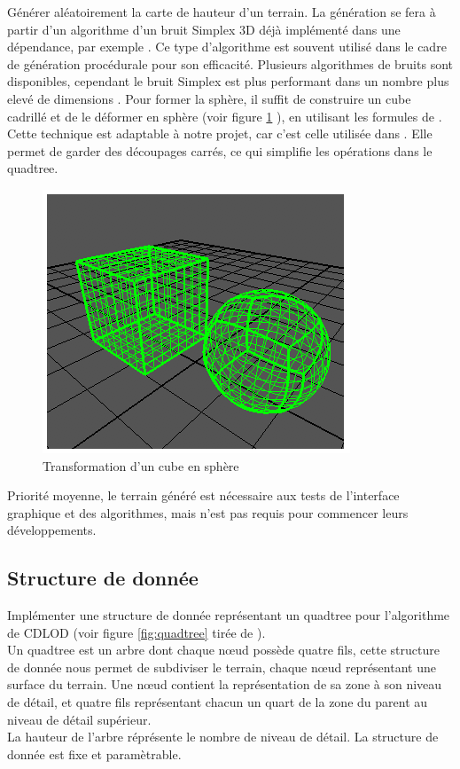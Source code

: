\documentclass[12pt]{report}
\begin{document}
Générer aléatoirement la carte de hauteur d'un terrain.  La génération
se fera à partir d'un algorithme d'un bruit Simplex 3D déjà implémenté
dans une dépendance, par exemple \cite{libnoise}. Ce type d'algorithme
est souvent utilisé dans le cadre de génération procédurale pour son
efficacité. Plusieurs algorithmes de bruits sont disponibles, cependant
le bruit Simplex est plus performant dans un nombre plus elevé de
dimensions \cite{Simplexnoise}.  Pour former la sphère, il suffit de
construire un cube cadrillé et de le déformer en sphère (voir figure \ref{fig:Cubetosphere} ), en utilisant
les formules de \cite{Cube2Sphere}. Cette technique est adaptable à
notre projet, car c'est celle utilisée dans \cite{WorldGenerator}. Elle
permet de garder des découpages carrés, ce qui simplifie les opérations
dans le quadtree.\\

\begin{figure}[!h]
  \includegraphics[scale=1]{img/Cubetosphere.png}
  \caption{Transformation d'un cube en sphère \cite{Cube2Sphere}}
  \label{fig:Cubetosphere}
\end{figure}


Priorité moyenne, le terrain généré est nécessaire aux tests de
l'interface graphique et des algorithmes, mais n'est pas requis pour
commencer leurs développements.\\


\subsection{Structure de donnée}

Implémenter une structure de donnée représentant un quadtree pour
l'algorithme de CDLOD (voir figure \ref{fig:quadtree} tirée de 
\cite{CDLOD}).\\
Un quadtree est un arbre dont chaque nœud possède quatre fils, cette
structure de donnée nous permet de subdiviser le terrain, chaque nœud
représentant une surface du terrain. Une nœud contient la représentation
de sa zone à son niveau de détail, et quatre fils représentant chacun un
quart de la zone du parent au niveau de détail supérieur.\\
La hauteur de l'arbre réprésente le nombre de niveau de détail.
La structure de donnée est fixe et paramètrable.
\end{document}
